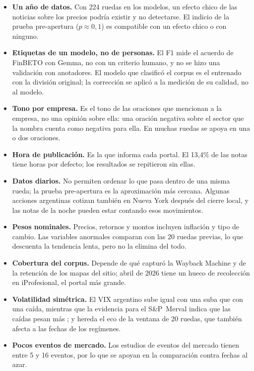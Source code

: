 \begin{itemize}
  \item \textbf{Un año de datos.} Con 224 ruedas en los modelos, un efecto chico de las noticias
        sobre los precios podría existir y no detectarse. El indicio de la prueba pre-apertura
        ($p\approx0{,}1$) es compatible con un efecto chico o con ninguno.
  \item \textbf{Etiquetas de un modelo, no de personas.} El F1 mide el acuerdo de FinBETO con
        Gemma, no con un criterio humano, y no se hizo una validación con anotadores. El modelo
        que clasificó el corpus es el entrenado con la división original; la corrección se
        aplicó a la medición de su calidad, no al modelo.
  \item \textbf{Tono por empresa.} Es el tono de las oraciones que mencionan a la empresa, no una
        opinión sobre ella: una oración negativa sobre el sector que la nombra cuenta como
        negativa para ella. En muchas ruedas se apoya en una o dos oraciones.
  \item \textbf{Hora de publicación.} Es la que informa cada portal. El 13,4\% de las notas tiene
        horas por defecto; los resultados se repitieron sin ellas.
  \item \textbf{Datos diarios.} No permiten ordenar lo que pasa dentro de una misma rueda; la
        prueba pre-apertura es la aproximación más cercana. Algunas acciones argentinas cotizan
        también en Nueva York después del cierre local, y las notas de la noche pueden estar
        contando esos movimientos.
  \item \textbf{Pesos nominales.} Precios, retornos y montos incluyen inflación y tipo de cambio.
        Las variables anormales comparan con las 20 ruedas previas, lo que descuenta la
        tendencia lenta, pero no la elimina del todo.
  \item \textbf{Cobertura del corpus.} Depende de qué capturó la Wayback Machine y de la
        retención de los mapas del sitio; abril de 2026 tiene un hueco de recolección en
        iProfesional, el portal más grande.
  \item \textbf{Volatilidad simétrica.} El VIX argentino sube igual con una suba que con una
        caída, mientras que la evidencia para el S\&P~Merval indica que las caídas pesan más
        \citep{otuki2008}; y hereda el eco de la ventana de 20 ruedas, que también afecta a las
        fechas de los regímenes.
  \item \textbf{Pocos eventos de mercado.} Los estudios de eventos del mercado tienen entre 5 y
        16 eventos, por lo que se apoyan en la comparación contra fechas al azar.
\end{itemize}

